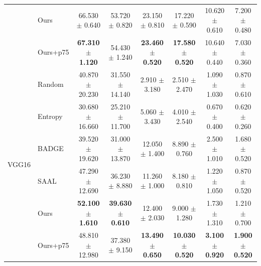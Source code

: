 \begin{table}[t]
{\begin{tabular}{llcccccc}
 & Ours & 66.530 $\pm$ 0.640 & 53.720 $\pm$ 0.820 & 23.150 $\pm$ 0.810 & 17.220 $\pm$ 0.590 & 10.620 $\pm$ 0.610 & 7.200 $\pm$ 0.480 \\
 & Ours+p75 & \textbf{67.310 $\pm$ 1.120} & 54.430 $\pm$ 1.240 & \textbf{23.460 $\pm$ 0.520} & \textbf{17.580 $\pm$ 0.520} & 10.640 $\pm$ 0.440 & 7.030 $\pm$ 0.360 \\
\midrule
\multirow{6}{*}{VGG16} & Random & 40.870 $\pm$ 20.230 & 31.550 $\pm$ 14.140 & 2.910 $\pm$ 3.180 & 2.510 $\pm$ 2.470 & 1.090 $\pm$ 1.030 & 0.870 $\pm$ 0.610 \\
 & Entropy & 30.680 $\pm$ 16.660 & 25.210 $\pm$ 11.700 & 5.060 $\pm$ 3.430 & 4.010 $\pm$ 2.540 & 0.670 $\pm$ 0.400 & 0.620 $\pm$ 0.260 \\
 & BADGE & 39.520 $\pm$ 19.620 & 31.000 $\pm$ 13.870 & 12.050 $\pm$ 1.400 & 8.890 $\pm$ 0.760 & 2.500 $\pm$ 1.010 & 1.680 $\pm$ 0.520 \\
 & SAAL & 47.290 $\pm$ 12.690 & 36.230 $\pm$ 8.880 & 11.260 $\pm$ 1.000 & 8.180 $\pm$ 0.810 & 1.220 $\pm$ 1.050 & 0.870 $\pm$ 0.520 \\
 & Ours & \textbf{52.100 $\pm$ 1.610} & \textbf{39.630 $\pm$ 0.610} & 12.400 $\pm$ 2.030 & 9.000 $\pm$ 1.280 & 1.730 $\pm$ 1.310 & 1.210 $\pm$ 0.700 \\
 & Ours+p75 & 48.810 $\pm$ 12.980 & 37.380 $\pm$ 9.150 & \textbf{13.490 $\pm$ 0.650} & \textbf{10.030 $\pm$ 0.520} & \textbf{3.100 $\pm$ 0.920} & \textbf{1.900 $\pm$ 0.520} \\
\bottomrule
\end{tabular}%
}
\end{table}

